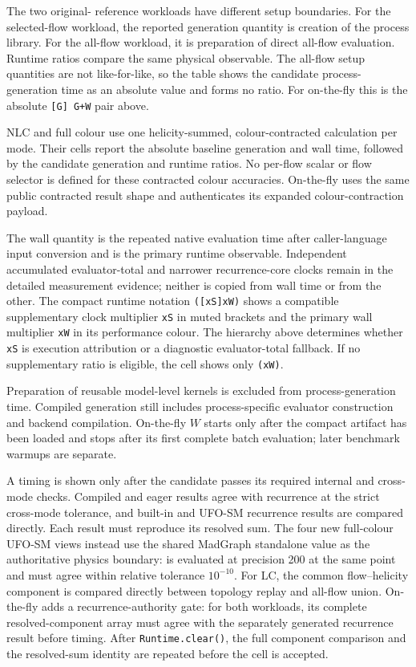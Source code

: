 The two original-\AC{} reference workloads have different setup boundaries.
For the selected-flow workload, the reported generation quantity is creation
of the process library. For the all-flow workload, it is preparation of direct
all-flow evaluation. Runtime ratios compare the same physical observable. The
all-flow setup quantities are not like-for-like, so the table shows the
candidate process-generation time as an absolute value and forms no ratio.
For on-the-fly this is the absolute \texttt{[G] G+W} pair above.

NLC and full colour use one helicity-summed, colour-contracted calculation per
mode. Their cells report the absolute baseline generation and wall time,
followed by the candidate generation and runtime ratios. No per-flow scalar or
flow selector is defined for these contracted colour accuracies. On-the-fly
uses the same public contracted result shape and authenticates its expanded
colour-contraction payload.

The wall quantity is the repeated native evaluation time after caller-language
input conversion and is the primary runtime observable. Independent accumulated
evaluator-total and narrower recurrence-core clocks remain in the detailed
measurement evidence; neither is copied from wall time or from the other. The
compact runtime notation \texttt{([xS]xW)} shows a compatible supplementary
clock multiplier \texttt{xS} in muted brackets and the primary wall multiplier
\texttt{xW} in its performance colour. The hierarchy above determines whether
\texttt{xS} is execution attribution or a diagnostic evaluator-total fallback.
If no supplementary ratio is eligible, the cell shows only \texttt{(xW)}.

Preparation of reusable model-level kernels is excluded from
process-generation time. Compiled generation still includes process-specific
evaluator construction and backend compilation. On-the-fly \(W\) starts only
after the compact artifact has been loaded and stops after its first complete
batch evaluation; later benchmark warmups are separate.

A timing is shown only after the candidate passes its required internal and
cross-mode checks. Compiled and eager results agree with recurrence at the
strict cross-mode tolerance, and built-in and UFO-SM recurrence results are
compared directly. Each result must reproduce its resolved sum. The four new
full-colour UFO-SM views instead use the shared MadGraph standalone value as
the authoritative physics boundary: \PAC{} is evaluated at precision 200 at
the same point and must agree within relative tolerance \(10^{-10}\). For LC,
the common flow--helicity component is compared directly between topology
replay and all-flow union. On-the-fly adds a recurrence-authority gate: for
both workloads, its complete resolved-component array must agree with the
separately generated recurrence result before timing. After
\texttt{Runtime.clear()}, the full component comparison and the resolved-sum
identity are repeated before the cell is accepted.

